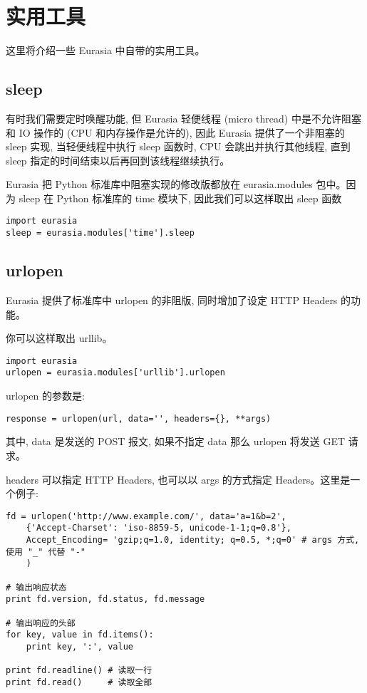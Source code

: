 \documentclass{manual}
\begin{document}

\section{实用工具}

这里将介绍一些 Eurasia 中自带的实用工具。

\subsection{sleep}

有时我们需要定时唤醒功能, 但 Eurasia 轻便线程 (micro thread) 中是不允许阻塞和 IO 操作的 (CPU 和内存操作是允许的), 因此 Eurasia 提供了一个非阻塞的 sleep 实现, 当轻便线程中执行 sleep 函数时, CPU 会跳出并执行其他线程, 直到 sleep 指定的时间结束以后再回到该线程继续执行。

Eurasia 把 Python 标准库中阻塞实现的修改版都放在 eurasia.modules 包中。因为 sleep 在 Python 标准库的 time 模块下, 因此我们可以这样取出 sleep 函数

\begin{verbatim}
import eurasia
sleep = eurasia.modules['time'].sleep
\end{verbatim}


\subsection{urlopen}

Eurasia 提供了标准库中 urlopen 的非阻版, 同时增加了设定 HTTP Headers 的功能。

你可以这样取出 urllib。

\begin{verbatim}
import eurasia
urlopen = eurasia.modules['urllib'].urlopen
\end{verbatim}

urlopen 的参数是:

\begin{verbatim}
response = urlopen(url, data='', headers={}, **args)
\end{verbatim}

其中, data 是发送的 POST 报文, 如果不指定 data 那么 urlopen 将发送 GET 请求。

headers 可以指定 HTTP Headers, 也可以以 args 的方式指定 Headers。这里是一个例子:

\begin{verbatim}
fd = urlopen('http://www.example.com/', data='a=1&b=2',
	{'Accept-Charset': 'iso-8859-5, unicode-1-1;q=0.8'},
	Accept_Encoding= 'gzip;q=1.0, identity; q=0.5, *;q=0' # args 方式, 使用 "_" 代替 "-"
	)

# 输出响应状态
print fd.version, fd.status, fd.message

# 输出响应的头部
for key, value in fd.items():
	print key, ':', value

print fd.readline() # 读取一行
print fd.read()     # 读取全部
\end{verbatim}
\end{document}
